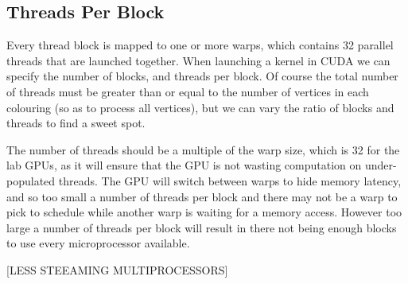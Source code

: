 \subsection{Threads Per Block}
Every thread block is mapped to one or more warps, which contains 32 parallel threads that are launched together. When launching a kernel in CUDA we can specify the number of blocks, and threads per block. Of course the total number of threads must be greater than or equal to the number of vertices in each colouring (so as to process all vertices), but we can vary the ratio of blocks and threads to find a sweet spot.

The number of threads should be a multiple of the warp size, which is 32 for the lab GPUs, as it will ensure that the GPU is not wasting computation on under-populated threads. The GPU will switch between warps to hide memory latency\cite{threads_atomics}, and so too small a number of threads per block and there may not be a warp to pick to schedule while another warp is waiting for a memory access. However too large a number of threads per block will result in there not being enough blocks to use every microprocessor available.

[LESS STEEAMING MULTIPROCESSORS]